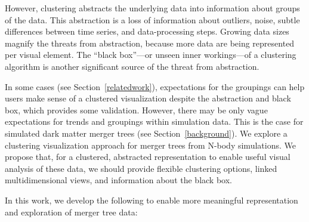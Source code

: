 However, clustering abstracts the underlying data into information about groups of the data. This abstraction is a loss of information about outliers, noise, subtle differences between time series, and data-processing steps. Growing data sizes magnify the threats from abstraction, because more data are being represented per visual element.  The ``black box''---or unseen inner workings---of a clustering algorithm is another significant source of the threat from abstraction. 


In some cases (see Section~\ref{relatedwork}), expectations for the groupings can help users make sense of a clustered visualization despite the abstraction and black box, which provides some validation. However, there may be only vague expectations for trends and groupings within simulation data. This is the case for simulated dark matter merger trees (see Section~\ref{background}). We explore a clustering visualization approach for merger trees from N-body simulations. We propose that, for a clustered, abstracted representation to enable useful visual analysis of these data, we should provide flexible clustering options, linked multidimensional views, and information about the black box. 



In this work, we develop the following to enable more meaningful representation and exploration of merger tree data:  

